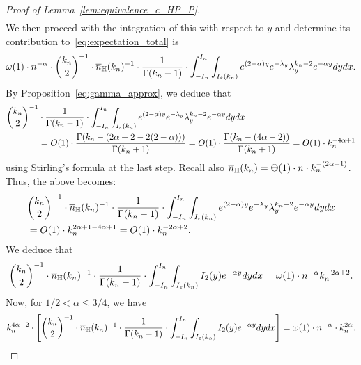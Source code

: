 \begin{proof}[Proof of Lemma~\ref{lem:equivalence_c_HP_P}]
\begin{equation*}
\begin{split}
\end{split}
\end{equation*}
We then proceed with the integration of this with respect to $y$ and determine its contribution to~\eqref{eq:expectation_total} is 
\begin{equation*} 
\begin{split}
\omega(1) \cdot n^{-\alpha} \cdot {k_n \choose 2}^{-1} \cdot \overline{n}_{\mathbb{H}}(k_n)^{-1} \cdot 
\frac{1}{\Gamma (k_n-1)} \cdot \int_{-I_n}^{I_n} \int_{I_{\varepsilon} (k_n)} e^{(2-\alpha )y} e^{-\lambda_y} \lambda_y^{k_n-2} e^{-\alpha y} dy dx.  
\end{split}
\end{equation*}
By Proposition~\ref{eq:gamma_approx}, we deduce that 
\begin{equation*}
\begin{split}
{k_n \choose 2}^{-1} & \cdot 
\frac{1}{\Gamma (k_n-1)} \cdot \int_{-I_n}^{I_n} \int_{I_{\varepsilon} (k_n)} e^{(2-\alpha )y} e^{-\lambda_y} \lambda_y^{k_n-2} e^{-\alpha y} dy dx \\
&= O(1)\cdot  \frac{\Gamma (k_n - (2\alpha + 2 -2(2-\alpha)))}{\Gamma (k_n+1)} 
= O(1)\cdot  \frac{\Gamma(k_n - (4\alpha - 2))}{\Gamma (k_n+1)} = O(1) \cdot k_n^{-4\alpha +1}
\end{split}
\end{equation*}
using Stirling's formula at the last step. 
Recall also $\overline{n}_{\mathbb{H}}(k_n) = \Theta (1) \cdot n \cdot k_n^{-(2\alpha +1)}$. 
Thus, the above becomes: 
\begin{equation*} 
\begin{split}
&{k_n \choose 2}^{-1} \cdot \overline{n}_{\mathbb{H}}(k_n)^{-1} \cdot 
\frac{1}{\Gamma (k_n-1)} \cdot \int_{-I_n}^{I_n} \int_{I_{\varepsilon} (k_n)} e^{(2-\alpha )y} e^{-\lambda_y} \lambda_y^{k_n-2} e^{-\alpha y} dy dx \\ 
&=O(1) \cdot k_n^{2\alpha +1 - 4\alpha +1} = O(1) \cdot k_n^{-2\alpha +2}. 
\end{split}
\end{equation*}
We deduce that 
\begin{equation*}
\begin{split}
{k_n \choose 2}^{-1} \cdot \overline{n}_{\mathbb{H}}(k_n)^{-1} \cdot 
\frac{1}{\Gamma (k_n-1)} \cdot \int_{-I_n}^{I_n} \int_{I_{\varepsilon} (k_n)}  I_2 (y) e^{-\alpha y} dy dx = \omega(1) \cdot n^{-\alpha} k_n^{-2\alpha+2}.
\end{split}
\end{equation*}
Now, for $1/2 < \alpha \leq 3/4$, we have
$$k_n^{4\alpha -2} \cdot \left[{k_n \choose 2}^{-1} \cdot \overline{n}_{\mathbb{H}}(k_n)^{-1} \cdot 
\frac{1}{\Gamma (k_n-1)} \cdot \int_{-I_n}^{I_n} \int_{I_{\varepsilon} (k_n)}  I_2 (y) e^{-\alpha y} dy dx \right] =\omega(1) \cdot n^{-\alpha} \cdot k_n^{2\alpha}.$$

\end{proof}
